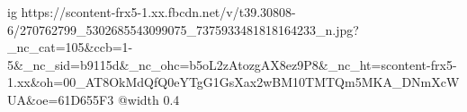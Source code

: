  
 
 
 
 

\ifcmt
  ig https://scontent-frx5-1.xx.fbcdn.net/v/t39.30808-6/270762799_5302685543099075_7375933481818164233_n.jpg?_nc_cat=105&ccb=1-5&_nc_sid=b9115d&_nc_ohc=b5oL2zAtozgAX8ez9P8&_nc_ht=scontent-frx5-1.xx&oh=00_AT8OkMdQfQ0eYTgG1GsXax2wBM10TMTQm5MKA_DNmXcWUA&oe=61D655F3
  @width 0.4
\fi

